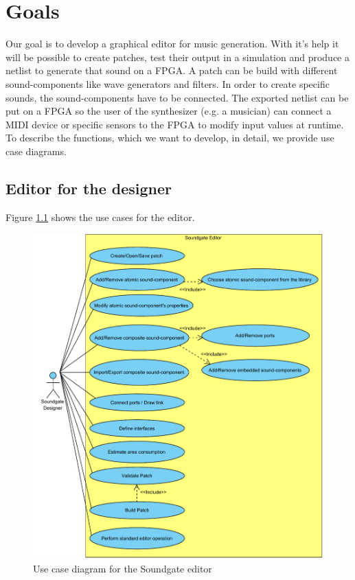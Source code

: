 \chapter{Goals}
\label{chapter:Goals}
Our goal is to develop a graphical editor for music generation. With it's help it will be possible to create patches, test their output in a simulation and produce a netlist to generate that sound on a \ac{FPGA}. A patch can be build with different sound-components like wave generators and filters. In order to create specific sounds, the sound-components have to be connected. The exported netlist can be put on a \ac{FPGA} so the user of the synthesizer (e.g. a musician) can connect a MIDI device or specific sensors to the \ac{FPGA} to modify input values at runtime. \\
To describe the functions, which we want to develop, in detail, we provide use case diagrams.

\section{Editor for the designer}
\label{editor}
Figure \ref{fig:Soundgate_Designer} shows the use cases for the editor.

	\begin{figure}[!h]
		\centering
			\includegraphics[width=1\textwidth]{images/Soundgate_Designer.pdf}
		\caption{Use case diagram for the Soundgate editor}
		\label{fig:Soundgate_Designer}
	\end{figure}

